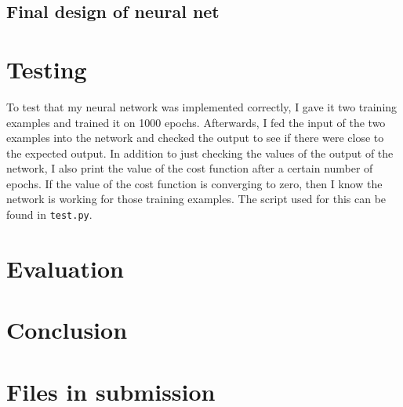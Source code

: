 \documentclass{article}
\begin{document}
\subsection{Final design of neural net}

\section{Testing}
To test that my neural network was implemented correctly, I gave it two training examples and trained it on 1000 epochs. Afterwards, I fed the input of the two examples into the network and checked the output to see if there were close to the expected output. In addition to just checking the values of the output of the network, I also print the value of the cost function after a certain number of epochs. If the value of the cost function is converging to zero, then I know the network is working for those training examples. The script used for this can be found in \texttt{test.py}. 
\section{Evaluation}

\section{Conclusion}



\section{Files in submission}

\printbibliography
\end{document}
